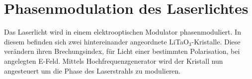 
\section{Phasenmodulation des Laserlichtes}

Das Laserlicht wird in einem elektrooptischen Modulator phasenmoduliert. In diesem befinden sich zwei hintereinander angeordnete LiTaO$_3$-Kristalle. Diese verändern ihren Brechungsindex, für Licht einer bestimmten Polarisation, bei angelegten E-Feld. Mittels Hochfrequenzgenerator wird der Kristall nun angesteuert um die Phase des Laserstrahls zu modulieren.